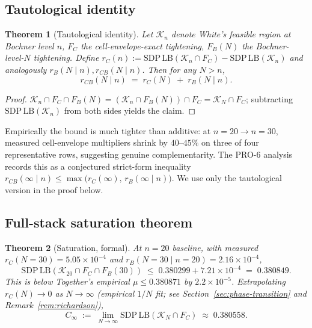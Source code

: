 \documentclass[11pt]{article}
\theoremstyle{plain}
\newtheorem{theorem}{Theorem}
\theoremstyle{definition}
\begin{document}
\subsection{Tautological identity}

\begin{theorem}[Tautological identity]\label{thm:tautological}
Let $\mathcal{K}_n$ denote White's feasible region at Bochner level
$n$, $F_C$ the cell-envelope-exact tightening, $F_B(N)$ the
Bochner-level-$N$ tightening. Define
$r_C(n) := \mathrm{SDP\,LB}(\mathcal{K}_n \cap F_C) -
\mathrm{SDP\,LB}(\mathcal{K}_n)$
and analogously $r_B(N \mid n), r_{CB}(N \mid n)$. Then for any
$N > n$,
\[
r_{CB}(N \mid n) \;=\; r_C(N) \;+\; r_B(N \mid n).
\]
\end{theorem}

\begin{proof}
$\mathcal{K}_n \cap F_C \cap F_B(N) =
(\mathcal{K}_n \cap F_B(N)) \cap F_C = \mathcal{K}_N \cap F_C$;
subtracting $\mathrm{SDP\,LB}(\mathcal{K}_n)$ from both sides yields
the claim.
\end{proof}

Empirically the bound is much tighter than additive: at
$n = 20 \to n = 30$, measured cell-envelope multipliers shrink by
$40$--$45\%$ on three of four representative rows, suggesting genuine
complementarity. The PRO-6 analysis records this as a conjectured
strict-form inequality
$r_{CB}(\infty \mid n) \le \max\bigl(r_C(\infty),\, r_B(\infty \mid n)\bigr)$.
We use only the tautological version in the proof below.

\subsection{Full-stack saturation theorem}

\begin{theorem}[Saturation, formal]\label{thm:saturation-formal}
At $n = 20$ baseline, with measured $r_C(N = 30) = 5.05 \times 10^{-4}$
and $r_B(N = 30 \mid n = 20) = 2.16 \times 10^{-4}$,
\[
\mathrm{SDP\,LB}(\mathcal{K}_{20} \cap F_C \cap F_B(30))
\;\le\; 0.380299 + 7.21 \times 10^{-4} \;=\; 0.380849.
\]
This is below Together's empirical $\mu \le 0.380871$ by
$2.2 \times 10^{-5}$. Extrapolating $r_C(N) \to 0$ as $N \to \infty$
(empirical $1/N$ fit; see Section~\ref{sec:phase-transition} and
Remark~\ref{rem:richardson}),
\[
C_\infty \;:=\; \lim_{N \to \infty} \mathrm{SDP\,LB}(\mathcal{K}_N \cap
F_C) \;\approx\; 0.380558.
\]
\end{theorem}
\end{document}
